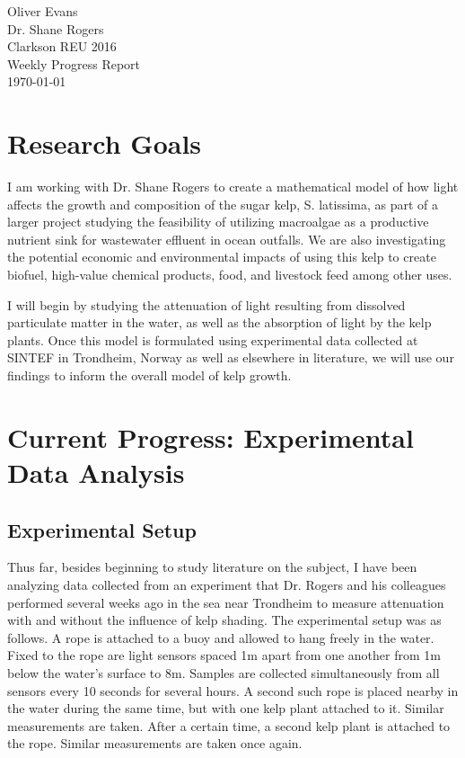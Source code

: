 \documentclass{article}
\begin{document}
\noindent
Oliver Evans \\
Dr. Shane Rogers \\
Clarkson REU 2016 \\
Weekly Progress Report \\
\today \\

\section{Research Goals}

I am working with Dr. Shane Rogers to create a mathematical model of how light affects the growth and composition of the sugar kelp, S. latissima, as part of a larger project studying the feasibility of utilizing macroalgae as a productive nutrient sink for wastewater effluent in ocean outfalls. We are also investigating the potential economic and environmental impacts of using this kelp to create biofuel, high-value chemical products, food, and livestock feed among other uses.

I will begin by studying the attenuation of light resulting from dissolved particulate matter in the water, as well as the absorption of light by the kelp plants. Once this model is formulated using experimental data collected at SINTEF in Trondheim, Norway as well as elsewhere in literature, we will use our findings to inform the overall model of kelp growth.

\section{Current Progress: Experimental Data Analysis}

\subsection{Experimental Setup}
Thus far, besides beginning to study literature on the subject, I have been analyzing data collected from an experiment that Dr. Rogers and his colleagues performed several weeks ago in the sea near Trondheim to measure attenuation with and without the influence of kelp shading. The experimental setup was as follows. A rope is attached to a buoy and allowed to hang freely in the water. Fixed to the rope are light sensors spaced 1m apart from one another from 1m below the water's surface to 8m. Samples are collected simultaneously from all sensors every 10 seconds for several hours. A second such rope is placed nearby in the water during the same time, but with one kelp plant attached to it. Similar measurements are taken. After a certain time, a second kelp plant is attached to the rope. Similar measurements are taken once again.
\end{document}
